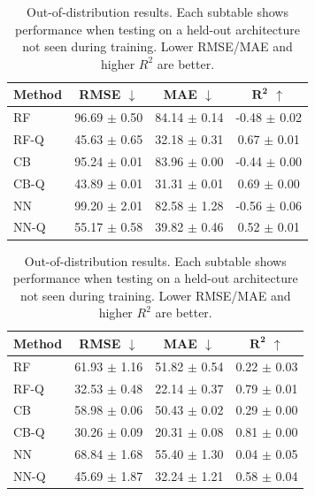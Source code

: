 \begin{table}[t]
    \centering
    \caption{Out-of-distribution results. Each subtable shows performance when testing on a held-out architecture not seen during training. Lower RMSE/MAE and higher $R^2$ are better.}
    \label{tab:ood-results}
    \vspace{0.5em}
    \begin{minipage}{0.48\textwidth}
        \centering
        \label{tab:ood-h100}
        \begin{tabular}{lccc}
            \toprule
            \textbf{Method} & \textbf{RMSE} $\downarrow$ & \textbf{MAE} $\downarrow$ & $\boldsymbol{R^2}$ $\uparrow$ \\
            \midrule
            RF      & 96.69 $\pm$ 0.50 & 84.14 $\pm$ 0.14 & -0.48 $\pm$ 0.02 \\
            RF-Q    & 45.63 $\pm$ 0.65 & 32.18 $\pm$ 0.31 & 0.67 $\pm$ 0.01 \\
            \midrule
            CB      & 95.24 $\pm$ 0.01 & 83.96 $\pm$ 0.00 & -0.44 $\pm$ 0.00 \\
            CB-Q    & 43.89 $\pm$ 0.01 & 31.31 $\pm$ 0.01 & 0.69 $\pm$ 0.00 \\
            \midrule
            NN      & 99.20 $\pm$ 2.01 & 82.58 $\pm$ 1.28 & -0.56 $\pm$ 0.06 \\
            NN-Q    & 55.17 $\pm$ 0.58 & 39.82 $\pm$ 0.46 & 0.52 $\pm$ 0.01 \\
            \bottomrule
        \end{tabular}
    \end{minipage}
    \hfill
    \begin{minipage}{0.48\textwidth}
        \centering
        \label{tab:ood-a100}
        \begin{tabular}{lccc}
            \toprule
            \textbf{Method} & \textbf{RMSE} $\downarrow$ & \textbf{MAE} $\downarrow$ & $\boldsymbol{R^2}$ $\uparrow$ \\
            \midrule
            RF      & 61.93 $\pm$ 1.16 & 51.82 $\pm$ 0.54 & 0.22 $\pm$ 0.03 \\
            RF-Q    & 32.53 $\pm$ 0.48 & 22.14 $\pm$ 0.37 & 0.79 $\pm$ 0.01 \\
            \midrule
            CB      & 58.98 $\pm$ 0.06 & 50.43 $\pm$ 0.02 & 0.29 $\pm$ 0.00 \\
            CB-Q    & 30.26 $\pm$ 0.09 & 20.31 $\pm$ 0.08 & 0.81 $\pm$ 0.00 \\
            \midrule
            NN      & 68.84 $\pm$ 1.68 & 55.40 $\pm$ 1.30 & 0.04 $\pm$ 0.05 \\
            NN-Q    & 45.69 $\pm$ 1.87 & 32.24 $\pm$ 1.21 & 0.58 $\pm$ 0.04 \\
            \bottomrule
        \end{tabular}
    \end{minipage}


\end{table}
